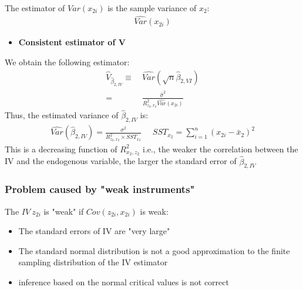 \documentclass[a4paper,twoside,11pt]{article}
\begin{document}
\begin{shaded*}
\begin{equation*}
\begin{aligned}
\end{aligned} 
\end{equation*}
The estimator of $Var(x_{2i})$ is the sample variance of $x_2$:
\begin{equation*}
\begin{aligned}
\widehat{Var}(x_{2i})
\end{aligned} 
\end{equation*}
\begin{itemize}
    \item \textbf{Consistent estimator of V}
\end{itemize}
We obtain the following estimator:
\begin{equation*}
\begin{aligned}
\hat{V}_{\hat{\beta}_{2,IV}} \equiv& \  \widehat{Var}(\sqrt{n} \hat{\beta}_{2,VI})  \\
=& \ \frac{\hat{\sigma}^2}{R^2_{z_2,x_2} \widehat{Var}(x_{2i})}
\end{aligned} 
\end{equation*}
Thus, the estimated variance of $\hat{\beta}_{2,IV}$ is:
\begin{equation*}
\begin{aligned}
\widehat{Var}(\hat{\beta}_{2,IV}) = \frac{\sigma^2}{R^2_{z_2,x_2}\times SST_{x_2}} \ \ \ \ \ \ SST_{x_2} = \sum^n_{i=1} (x_{2i} - \bar x_2)^2
\end{aligned} 
\end{equation*}
This is a decreasing function of $R^2_{x_2,z_2}$ i.e., the weaker the correlation between the IV and the endogenous variable, the larger the standard error of $\hat{\beta}_{2,IV}$
\end{shaded*}
\subsubsection{Problem caused by "weak instruments"}
The $IV \ z_{2i}$ is "weak" if $Cov(z_{2i},x_{2i})$ is weak:
\begin{itemize}
    \item The standard errors of IV are "very large" 
    \item The standard normal distribution is not a good approximation to the finite sampling distribution of the IV estimator 
    \item inference based on the normal critical values is not correct
\end{itemize}
\end{document}
